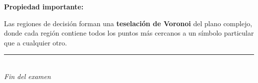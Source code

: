 \documentclass[11pt,a4paper]{article}
\begin{document}
\textbf{Propiedad importante:}

Las regiones de decisi\'on forman una \textbf{teselaci\'on de Voronoi} del plano complejo, donde cada regi\'on contiene todos los puntos m\'as cercanos a un s\'imbolo particular que a cualquier otro.



\vspace{1cm}
\begin{center}
\rule{0.8\linewidth}{0.4pt}\\
\textit{Fin del examen}
\end{center}
\end{document}
